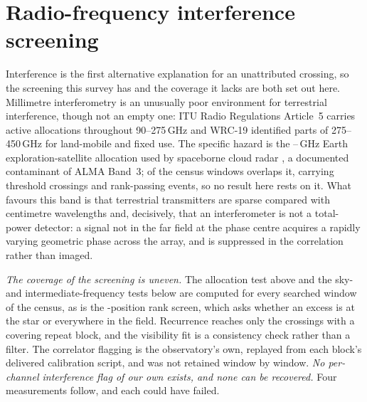 \section{Radio-frequency interference screening}
\label{app:rfi}

Interference is the first alternative explanation for an unattributed
crossing, so the screening this survey has and the coverage it lacks are both
set out here. Millimetre interferometry is an unusually poor
environment for terrestrial interference, though not an empty one: ITU Radio
Regulations Article~5 \citep{ITU2024} carries active allocations throughout
90--275\,GHz and WRC-19 identified parts of 275--450\,GHz for land-mobile and
fixed use. The specific hazard is the \RadarLo--\RadarHi\,GHz Earth
exploration-satellite allocation used by spaceborne cloud radar
\citep{CloudSat2002,EarthCARE2023}, a documented contaminant of ALMA Band~3;
\RadarNWin{} of the \RadarNTot{} census windows overlaps it, carrying
\RadarNCross{} threshold crossings and \RadarNStage{} rank-passing events, so
no result here rests on it. What favours this band is that terrestrial
transmitters are sparse compared with centimetre wavelengths and, decisively,
that an interferometer is not a total-power detector: a signal not in the far
field at the phase centre acquires a rapidly varying geometric phase across
the array, and is suppressed in the correlation rather than imaged.

\emph{The coverage of the screening is uneven.} The allocation test above and
the sky- and intermediate-frequency tests below are computed for every
searched window of the census, as is the \NCtrl-position rank screen, which
asks whether an excess is at the star or everywhere in the field. Recurrence
reaches only the crossings with a covering repeat block, and the visibility
fit is a consistency check rather than a filter. The correlator flagging is
the observatory's own, replayed from each block's delivered calibration
script, and was not retained window by window. \emph{No per-channel
interference flag of our own exists, and none can be recovered.} Four
measurements follow, and each could have failed.

